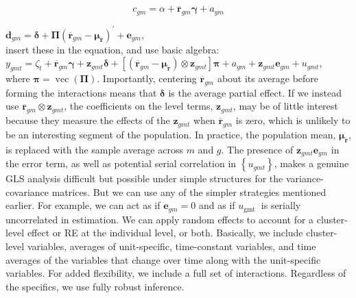 \documentclass[10pt]{article}
\begin{document}
\begin{equation*}
c_{g m}=\alpha+\overline{\mathbf{r}}_{g m} \boldsymbol{\gamma}+a_{g m} \tag{20.61}
\end{equation*}


$\mathbf{d}_{g m}=\boldsymbol{\delta}+\boldsymbol{\Pi}\left(\overline{\mathbf{r}}_{g m}-\boldsymbol{\mu}_{\overline{\mathbf{r}}}\right)^{\prime}+\mathbf{e}_{g m}$,\\
insert these in the equation, and use basic algebra:\\
$y_{g m t}=\zeta_{t}+\overline{\mathbf{r}}_{g m} \boldsymbol{\gamma}+\mathbf{z}_{g m t} \boldsymbol{\delta}+\left[\left(\overline{\mathbf{r}}_{g m}-\boldsymbol{\mu}_{\overline{\mathbf{r}}}\right) \otimes \mathbf{z}_{g m t}\right] \boldsymbol{\pi}+a_{g m}+\mathbf{z}_{g m t} \mathbf{e}_{g m}+u_{g m t}$,\\
where $\boldsymbol{\pi}=\operatorname{vec}(\boldsymbol{\Pi})$. Importantly, centering $\overline{\mathbf{r}}_{g m}$ about its average before forming the interactions means that $\boldsymbol{\delta}$ is the average partial effect. If we instead use $\overline{\mathbf{r}}_{g m} \otimes \mathbf{z}_{g m t}$, the coefficients on the level terms, $\mathbf{z}_{g m t}$, may be of little interest because they measure the effects of the $\mathbf{z}_{g m t}$ when $\overline{\mathbf{r}}_{g m}$ is zero, which is unlikely to be an interesting segment of the population. In practice, the population mean, $\boldsymbol{\mu}_{\overline{\mathbf{r}}}$, is replaced with the sample average across $m$ and $g$. The presence of $\mathbf{z}_{g m t} \mathbf{e}_{g m}$ in the error term, as well as potential serial correlation in $\left\{u_{g m t}\right\}$, makes a genuine GLS analysis difficult but possible under simple structures for the variance-covariance matrices. But we can use any of the simpler strategies mentioned earlier. For example, we can act as if $\mathbf{e}_{g m}=0$ and as if $u_{\text {gmt }}$ is serially uncorrelated in estimation. We can apply random effects to account for a cluster-level effect or RE at the individual level, or both. Basically, we include cluster-level variables, averages of unit-specific, time-constant variables, and time averages of the variables that change over time along with the unit-specific variables. For added flexibility, we include a full set of interactions. Regardless of the specifics, we use fully robust inference.
\end{document}
